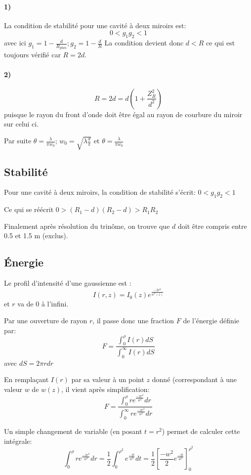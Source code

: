 \documentclass{book}
\begin{document}
\paragraph{1)}
La condition de stabilité pour une cavité à deux miroirs est:
$$0 < g_1g_2 < 1$$
avec ici $g_1=1-\frac d{R_{plan}}; g_2=1-\frac dR$
La condition devient donc $d < R$ ce qui est toujours vérifié car $R=2d$.

\paragraph{2)}
$$R=2d=d\left(1+\frac{Z_R^2}{d^2}\right)$$
puisque le rayon du front d'onde doit être égal au rayon de courbure du miroir sur celui ci. 
 
Par suite $\theta=\frac\lambda{\pi w_0}$; $w_0=\sqrt{\lambda\frac d \pi}$ et $\theta=\frac\lambda{\pi w_0}$

\subsection{Stabilité}

Pour une cavité à deux miroirs, la condition de stabilité s'écrit: $0 < g_1g_2 < 1$

Ce qui se réécrit $0 > (R_1-d)(R_2-d) > R_1R_2$

Finalement après résolution du trinôme, on trouve que $d$ doit être compris entre 0.5 et 1.5 m (exclus).

\subsection{Énergie}

Le profil d'intensité d'une gaussienne est :
\[I(r, z) = I_0(z) e^\frac{-2r^2}{w^2(z)}\]
et \(r\) va de 0 à l'infini.

Par une ouverture de rayon \(r\), il passe donc une fraction \(F\) de l'énergie définie par:
\[F=\frac{\int_0^\rho I(r) dS}{\int_0^\infty I(r) dS}\]
avec \(dS=2\pi r dr\)

En remplaçant \(I(r)\) par sa valeur à un point \(z\) donné (correspondant à une valeur \(w\) de \(w(z)\), il vient après simplification:
\[F=\frac{\int_0^\rho re^\frac{-2r^2}{w^2} dr}{\int_0^\infty re^\frac{-2r^2}{w^2} dr}\]

Un simple changement de variable (en posant \(t=r^2\)) permet de calculer cette intégrale:
\[\int_0^\rho re^\frac{-2r^2}{w^2} dr = \frac 12 \int_0^{\rho ^2} e^\frac{-2t}{w^2} dt = \frac 12 \left[\frac {-w^2}2e^\frac{-2t}{w^2}\right]_0^{\rho ^2}\]
\end{document}
